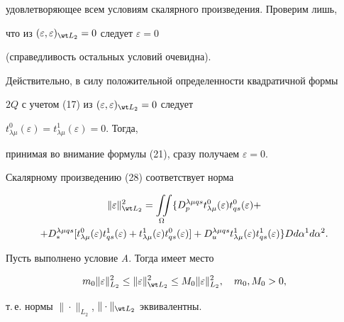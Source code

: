 удовлетворяющее всем условиям скалярного произведения. Проверим лишь, 


что из $(\varepsilon,\varepsilon)_{\wt L_2}=0$ следует $\varepsilon=0$ 


(справедливость остальных условий очевидна). 


Действительно, в силу положительной определенности квадратичной формы 


$2Q$ с учетом (17) из $(\varepsilon,\varepsilon)_{\wt L_2}=0$ следует 


$t^0_{\lambda\mu}(\varepsilon)=t^1_{\lambda\mu}(\varepsilon)=0$. Тогда, 


принимая во внимание формулы (21), сразу получаем $\varepsilon=0$. 


 


Скалярному произведению (28) соответствует норма 


\begin{multline} 


\|\varepsilon\|^2_{\wt L_2}=\intO\{D^{\lambda\mu qs}_p 


t^0_{\lambda\mu}(\varepsilon)t^0_{qs}(\varepsilon)+ \\ 


+D^{\lambda\mu qs}_*[t^0_{\lambda\mu}(\varepsilon) 


t^1_{qs}(\varepsilon)+t^1_{\lambda\mu}(\varepsilon) 


t^0_{qs}(\varepsilon)]+D^{\lambda\mu qs}_u t^1_{\lambda\mu} 


(\varepsilon)t^1_{qs}(\varepsilon)\}D d\alpha^1d\alpha^2. 


\end{multline} 


 


\begin{lem} 


Пусть выполнено условие {\em A}. Тогда имеет место 


$$ 


m_0\|\varepsilon\|^2_{L_2}\le\|\varepsilon\|^2_{\wt L_2}\le 


M_0\|\varepsilon\|^2_{L_2},\quad m_0,M_0>0, 


$$ 


т.\,е. нормы $\|\cdot\|_{L_2}$, $\|\cdot\|_{\wt L_2}$ эквивалентны. 


\end{lem} 


 


